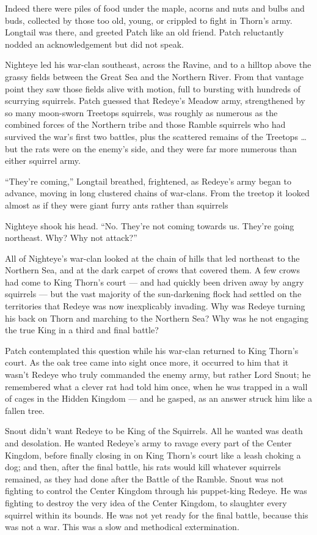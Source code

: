 \documentclass[ebook,oneside,openany,17pt]{memoir}
\begin{document}
Indeed there were piles of food under the maple, acorns and nuts and
bulbs and buds, collected by those too old, young, or crippled to
fight in Thorn’s army. Longtail was there, and greeted Patch like an
old friend. Patch reluctantly nodded an acknowledgement but did not
speak.

Nighteye led his war-clan southeast, across the Ravine, and to a
hilltop above the grassy fields between the Great Sea and the Northern
River. From that vantage point they saw those fields alive with
motion, full to bursting with hundreds of scurrying squirrels. Patch
guessed that Redeye’s Meadow army, strengthened by so many moon-sworn
Treetops squirrels, was roughly as numerous as the combined forces of
the Northern tribe and those Ramble squirrels who had survived the
war’s first two battles, plus the scattered remains of the Treetops …
but the rats were on the enemy’s side, and they were far more numerous
than either squirrel army.

“They’re coming,” Longtail breathed, frightened, as Redeye’s army
began to advance, moving in long clustered chains of war-clans. From
the treetop it looked almost as if they were giant furry ants rather
than squirrels

Nighteye shook his head. “No. They’re not coming towards us. They’re
going northeast. Why? Why not attack?”

All of Nighteye’s war-clan looked at the chain of hills that led
northeast to the Northern Sea, and at the dark carpet of crows that
covered them. A few crows had come to King Thorn’s court — and had
quickly been driven away by angry squirrels — but the vast majority of
the sun-darkening flock had settled on the territories that Redeye was
now inexplicably invading. Why was Redeye turning his back on Thorn
and marching to the Northern Sea? Why was he not engaging the true
King in a third and final battle?

Patch contemplated this question while his war-clan returned to King
Thorn’s court. As the oak tree came into sight once more, it occurred
to him that it wasn’t Redeye who truly commanded the enemy army, but
rather Lord Snout; he remembered what a clever rat had told him once,
when he was trapped in a wall of cages in the Hidden Kingdom — and he
gasped, as an answer struck him like a fallen tree.

Snout didn’t want Redeye to be King of the Squirrels. All he wanted
was death and desolation. He wanted Redeye’s army to ravage every part
of the Center Kingdom, before finally closing in on King Thorn’s court
like a leash choking a dog; and then, after the final battle, his rats
would kill whatever squirrels remained, as they had done after the
Battle of the Ramble. Snout was not fighting to control the Center
Kingdom through his puppet-king Redeye. He was fighting to destroy the
very idea of the Center Kingdom, to slaughter every squirrel within
its bounds. He was not yet ready for the final battle, because this
was not a war. This was a slow and methodical extermination.
\end{document}
